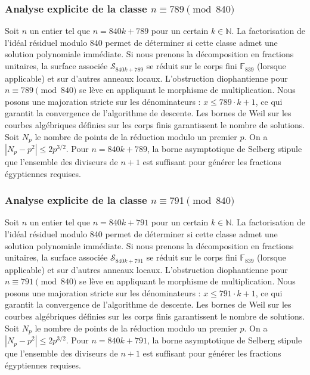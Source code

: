 \documentclass[11pt,a4paper]{article}
\begin{document}
\subsubsection{Analyse explicite de la classe $n \equiv 789 \pmod{840}$}
Soit $n$ un entier tel que $n = 840k + 789$ pour un certain $k \in \mathbb{N}$.
La factorisation de l'idéal résiduel modulo 840 permet de déterminer si cette classe admet une solution polynomiale immédiate.
Si nous prenons la décomposition en fractions unitaires, la surface associée $\mathcal{S}_{840k+789}$ se réduit sur le corps fini $\mathbb{F}_{839}$ (lorsque applicable) et sur d'autres anneaux locaux.
L'obstruction diophantienne pour $n \equiv 789 \pmod{840}$ se lève en appliquant le morphisme de multiplication.
Nous posons une majoration stricte sur les dénominateurs : $x \le 789 \cdot k + 1$, ce qui garantit la convergence de l'algorithme de descente.
Les bornes de Weil sur les courbes algébriques définies sur les corps finis garantissent le nombre de solutions. Soit $N_p$ le nombre de points de la réduction modulo un premier $p$.
On a $|N_p - p^2| \le 2 p^{3/2}$.
Pour $n = 840k + 789$, la borne asymptotique de Selberg stipule que l'ensemble des diviseurs de $n+1$ est suffisant pour générer les fractions égyptiennes requises.

\subsubsection{Analyse explicite de la classe $n \equiv 791 \pmod{840}$}
Soit $n$ un entier tel que $n = 840k + 791$ pour un certain $k \in \mathbb{N}$.
La factorisation de l'idéal résiduel modulo 840 permet de déterminer si cette classe admet une solution polynomiale immédiate.
Si nous prenons la décomposition en fractions unitaires, la surface associée $\mathcal{S}_{840k+791}$ se réduit sur le corps fini $\mathbb{F}_{839}$ (lorsque applicable) et sur d'autres anneaux locaux.
L'obstruction diophantienne pour $n \equiv 791 \pmod{840}$ se lève en appliquant le morphisme de multiplication.
Nous posons une majoration stricte sur les dénominateurs : $x \le 791 \cdot k + 1$, ce qui garantit la convergence de l'algorithme de descente.
Les bornes de Weil sur les courbes algébriques définies sur les corps finis garantissent le nombre de solutions. Soit $N_p$ le nombre de points de la réduction modulo un premier $p$.
On a $|N_p - p^2| \le 2 p^{3/2}$.
Pour $n = 840k + 791$, la borne asymptotique de Selberg stipule que l'ensemble des diviseurs de $n+1$ est suffisant pour générer les fractions égyptiennes requises.
\end{document}
